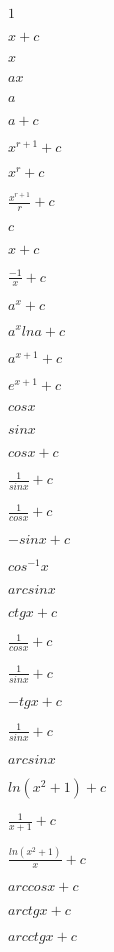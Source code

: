 \documentclass{article}
\begin{document}

$
1
$

$
x + c
$

$
x
$


$
ax
$

$
a
$

$
a + c
$


$
x^{r+1} + c
$

$
x^r + c
$

$
\frac{x^{r+1}}{r} + c
$


$
c
$

$
x + c
$

$
\frac{-1}{x} + c
$


$
a^x + c
$

$
a^x lna + c
$

$
a^{x+1} + c
$


$
e^{x+1} + c
$

$
cosx
$

$
sinx
$

$
cosx + c
$

$
\frac{1}{sinx} + c
$

$
\frac{1}{cosx} + c
$

$
-sinx + c
$

$
cos^{-1}x
$

$
arcsinx
$


$
ctgx + c
$

$
\frac{1}{cosx} + c
$

$
\frac{1}{sinx} + c
$


$
-tgx + c
$

$
\frac{1}{sinx} + c
$

$
arcsinx
$


$
ln(x^2+1) + c
$

$
\frac{1}{x+1} + c
$

$
\frac{ln(x^2+1)}{x} + c
$


$
arccosx + c
$

$
arctgx + c
$

$
arcctgx + c
$
\end{document}
